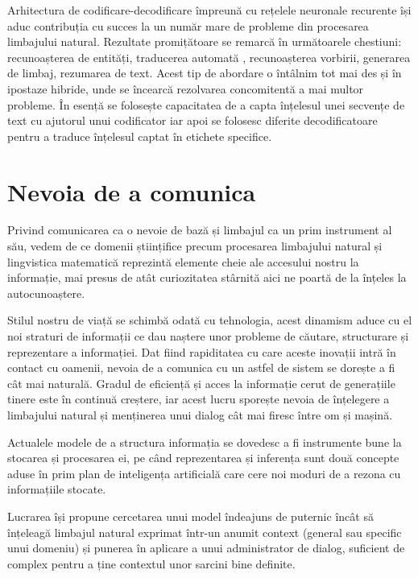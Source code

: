 Arhitectura de codificare-decodificare împreună cu rețelele neuronale recurente își aduc contribuția cu succes la un număr mare de probleme din procesarea limbajului natural. Rezultate promițătoare se remarcă în următoarele chestiuni: recunoașterea de entități, traducerea automată  \cite{luoung_bahdanau_maning}, recunoașterea vorbirii, generarea de limbaj, rezumarea de text. Acest tip de abordare o întâlnim tot mai des și în ipostaze hibride, unde se încearcă rezolvarea concomitentă a mai multor probleme. În esență se folosește capacitatea de a capta înțelesul unei secvențe de text cu ajutorul unui codificator iar apoi se folosesc diferite decodificatoare pentru a traduce înțelesul captat în etichete specifice.

\section{Nevoia de a comunica}

Privind comunicarea ca o nevoie de bază și limbajul ca un prim instrument al său, vedem de ce domenii științifice precum procesarea limbajului natural și lingvistica matematică reprezintă elemente cheie ale accesului nostru la informație, mai presus de atât curiozitatea stârnită aici ne poartă de la înțeles la autocunoaștere.

Stilul nostru de viață se schimbă odată cu tehnologia, acest dinamism aduce cu el noi straturi de informații ce dau naștere unor probleme de căutare, structurare și reprezentare a informației. Dat fiind rapiditatea cu care aceste inovații intră în contact cu oamenii, nevoia de a comunica cu un astfel de sistem se dorește a fi cât mai naturală. Gradul de eficiență și acces la informație cerut de generațiile tinere este în continuă creștere, iar acest lucru sporește nevoia de înțelegere a limbajului natural și menținerea unui dialog cât mai firesc între om și mașină.

Actualele modele de a structura informația se dovedesc a fi instrumente bune la stocarea și procesarea ei, pe când reprezentarea și inferența sunt două concepte aduse în prim plan de inteligența artificială care cere noi moduri de a rezona cu informațiile stocate.

Lucrarea își propune cercetarea unui model îndeajuns de puternic încât să înțeleagă limbajul natural exprimat într-un anumit context (general sau specific unui domeniu) și punerea în aplicare a unui administrator de dialog, suficient de complex pentru a ține contextul unor sarcini bine definite.

